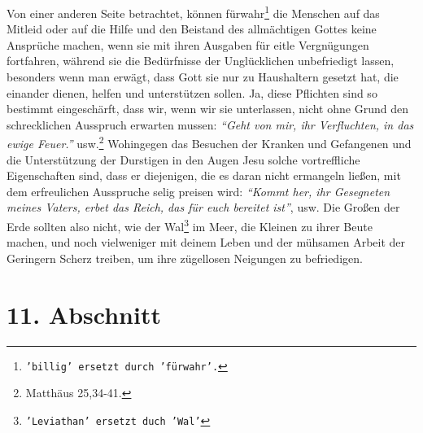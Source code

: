 Von einer anderen Seite
betrachtet, können fürwahr\footnote{\texttt{'billig' ersetzt durch 'fürwahr'.}}
die Menschen auf das Mitleid oder auf die Hilfe und
den Beistand des allmächtigen Gottes keine Ansprüche machen, wenn sie mit ihren
Ausgaben für eitle Vergnügungen fortfahren, während sie die Bedürfnisse der
Unglücklichen unbefriedigt lassen, besonders wenn man erwägt, dass Gott sie nur
zu Haushaltern gesetzt hat, die einander dienen, helfen und unterstützen sollen.
Ja, diese Pflichten sind so bestimmt eingeschärft, dass wir, wenn wir sie
unterlassen, nicht ohne Grund den schrecklichen Ausspruch erwarten mussen:
\textit{"`Geht von mir, ihr Verfluchten, in das ewige
Feuer."'} usw.\footnote{Matthäus 25,34-41.}
Wohingegen das Besuchen der Kranken und Gefangenen und die
Unterstützung der Durstigen in den Augen Jesu solche vortreffliche Eigenschaften
sind, dass er diejenigen, die es daran nicht ermangeln ließen, mit dem
erfreulichen Ausspruche selig preisen wird:
\textit{"`Kommt her, ihr Gesegneten meines
Vaters, erbet das Reich, das für euch bereitet ist"'}, usw. Die Großen der
Erde sollten also nicht, wie der Wal\footnote{\texttt{'Leviathan' ersetzt duch
'Wal'}} im Meer, die Kleinen zu ihrer Beute
machen, und noch vielweniger mit deinem Leben und der mühsamen Arbeit der
Geringern Scherz treiben, um ihre zügellosen Neigungen zu befriedigen.

\section{11. Abschnitt} \label{kap18_ab11}

